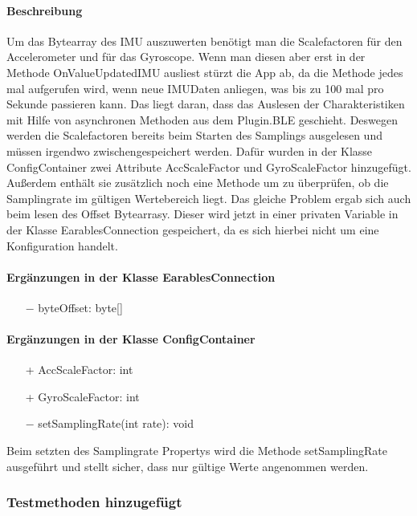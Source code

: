 \documentclass[a4paper,12pt]{article}
\begin{document}
\paragraph{Beschreibung}
Um das Bytearray des IMU auszuwerten benötigt man die Scalefactoren für den Accelerometer und für das Gyroscope. Wenn man diesen aber erst in der Methode OnValueUpdatedIMU ausliest stürzt die App ab, da die Methode jedes mal aufgerufen wird, wenn neue IMUDaten anliegen, was bis zu 100 mal pro Sekunde passieren kann. Das liegt daran, dass das Auslesen der Charakteristiken mit Hilfe von asynchronen Methoden aus dem Plugin.BLE geschieht. Deswegen werden die Scalefactoren bereits beim Starten des Samplings ausgelesen und müssen irgendwo zwischengespeichert werden. Dafür wurden in der Klasse ConfigContainer zwei Attribute AccScaleFactor und GyroScaleFactor hinzugefügt. Außerdem enthält sie zusätzlich noch eine Methode um zu überprüfen, ob die Samplingrate im gültigen Wertebereich liegt. Das gleiche Problem ergab sich auch beim lesen des Offset Bytearrasy. Dieser wird jetzt in einer privaten Variable in der Klasse EarablesConnection gespeichert, da es sich hierbei nicht um eine Konfiguration handelt.

\paragraph{Ergänzungen in der Klasse EarablesConnection}
\begin{itemize}
	\item[$-$] byteOffset: byte[]
\end{itemize}

\paragraph{Ergänzungen in der Klasse ConfigContainer}
\begin{itemize}
	\item[+] AccScaleFactor: int 
	\item[+] GyroScaleFactor: int
	\item[$-$]  setSamplingRate(int rate): void 
\end{itemize}
Beim setzten des Samplingrate Propertys wird die Methode setSamplingRate ausgeführt und stellt sicher, dass nur gültige Werte angenommen werden.

\subsubsection{Testmethoden hinzugefügt}
\end{document}
